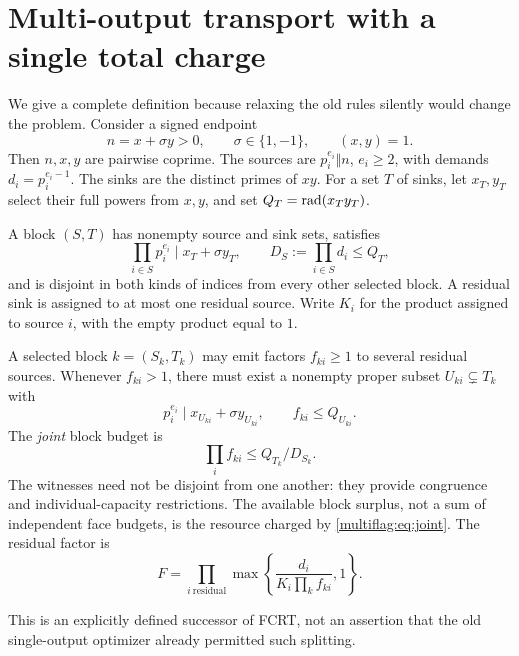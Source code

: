 \section{Multi-output transport with a single total charge}\label{multiflag:sec:multi}
We give a complete definition because relaxing the old rules silently would change the problem. Consider a signed endpoint
\[
 n=x+\sigma y>0,\qquad \sigma\in\{1,-1\},\qquad (x,y)=1.
\]
Then \(n,x,y\) are pairwise coprime. The sources are \(p_i^{e_i}\Vert n\), \(e_i\ge2\), with demands \(d_i=p_i^{e_i-1}\). The sinks are the distinct primes of \(xy\). For a set \(T\) of sinks, let \(x_T,y_T\) select their full powers from \(x,y\), and set \(Q_T=\operatorname{rad}(x_Ty_T)\).

A block \((S,T)\) has nonempty source and sink sets, satisfies
\[
 \prod_{i\in S}p_i^{e_i}\mid x_T+\sigma y_T,\qquad
 D_S:=\prod_{i\in S}d_i\le Q_T,
\]
and is disjoint in both kinds of indices from every other selected block. A residual sink is assigned to at most one residual source. Write \(K_i\) for the product assigned to source \(i\), with the empty product equal to \(1\).

\begin{definition}
A selected block \(k=(S_k,T_k)\) may emit factors \(f_{ki}\ge1\) to several residual sources. Whenever \(f_{ki}>1\), there must exist a nonempty proper subset \(U_{ki}\subsetneq T_k\) with
\[
 p_i^{e_i}\mid x_{U_{ki}}+\sigma y_{U_{ki}},\qquad f_{ki}\le Q_{U_{ki}}.
\]
The \emph{joint} block budget is
\begin{equation}\label{multiflag:eq:joint}
 \prod_i f_{ki}\le Q_{T_k}/D_{S_k}.
\end{equation}
The witnesses need not be disjoint from one another: they provide congruence and individual-capacity restrictions. The available block surplus, not a sum of independent face budgets, is the resource charged by \eqref{multiflag:eq:joint}. The residual factor is
\[
 F=\prod_{i\ \mathrm{residual}}\max\left\{\frac{d_i}{K_i\prod_k f_{ki}},1\right\}.
\]
\end{definition}
This is an explicitly defined successor of FCRT, not an assertion that the old single-output optimizer already permitted such splitting.

